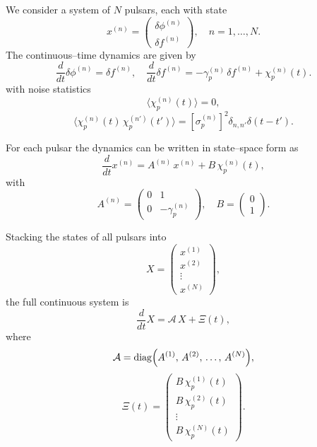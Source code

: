 \documentclass{tufte-handout} %
\begin{document}
We consider a system of $N$ pulsars, each with state
\begin{equation}
x^{(n)} = \begin{pmatrix} \delta\phi^{(n)} \\[1mm] \delta f^{(n)} \end{pmatrix}, \quad n=1,\ldots,N.
\end{equation}
The continuous--time dynamics are given by
\begin{equation}
\frac{d}{dt}\delta\phi^{(n)} = \delta f^{(n)}, \quad \frac{d}{dt}\delta f^{(n)} = -\gamma_p^{(n)}\,\delta f^{(n)} + \chi_p^{(n)}(t).
\end{equation}
with noise statistics
\begin{equation}
\langle \chi_p^{(n)}(t) \rangle = 0,
\end{equation}
\begin{equation}
\langle \chi_p^{(n)}(t) \, \chi_p^{(n')}(t') \rangle = \left[\sigma_p^{(n)}\right]^2 \delta_{n,n'} \delta(t-t').
\end{equation}

For each pulsar the dynamics can be written in state--space form as
\begin{equation}
\frac{d}{dt}x^{(n)} = A^{(n)}\,x^{(n)} + B\,\chi_p^{(n)}(t),
\end{equation}
with
\begin{equation}
A^{(n)} = \begin{pmatrix} 0 & 1 \\[1mm] 0 & -\gamma_p^{(n)} \end{pmatrix}, \quad
B = \begin{pmatrix} 0 \\[1mm] 1 \end{pmatrix}.
\end{equation}

Stacking the states of all pulsars into
\begin{equation}
X = \begin{pmatrix} x^{(1)} \\[1mm] x^{(2)} \\[1mm] \vdots \\[1mm] x^{(N)} \end{pmatrix},
\end{equation}
the full continuous system is
\begin{equation}
\frac{d}{dt} X = \mathcal{A}\, X + \Xi(t),
\end{equation}
where
\begin{equation}
\mathcal{A} = \operatorname{diag}\Bigl(A^{(1)},\,A^{(2)},\,\ldots,\,A^{(N)}\Bigr),
\end{equation}
\begin{equation}
\Xi(t) = \begin{pmatrix} B\,\chi_p^{(1)}(t) \\[1mm] B\,\chi_p^{(2)}(t) \\[1mm] \vdots \\[1mm] B\,\chi_p^{(N)}(t) \end{pmatrix}.
\end{equation}
\end{document}
